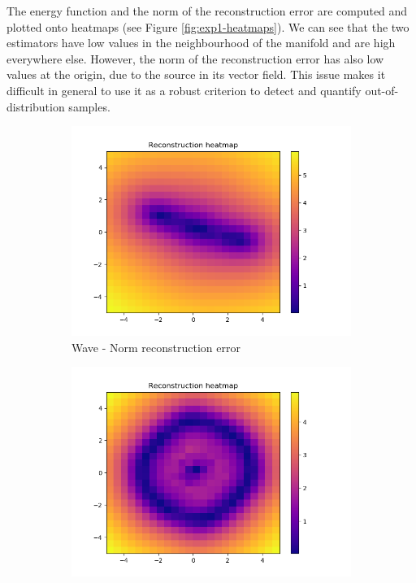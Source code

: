 The energy function and the norm of the reconstruction error are computed and plotted onto heatmaps (see Figure \ref{fig:exp1-heatmaps}). We can see that the two estimators have low values in the neighbourhood of the manifold and are high everywhere else. However, the norm of the reconstruction error has also low values at the origin, due to the source in its vector field. This issue makes it difficult in general to use it as a robust criterion to detect and quantify out-of-distribution samples.
\begin{figure}[!h]
\centering
\begin{subfigure}{.5\textwidth}
  \centering
  \includegraphics[width=.95\linewidth]{figures/wave-quantifier-reconstruction}
  \caption{Wave - Norm reconstruction error}
\end{subfigure}%
\begin{subfigure}{.5\textwidth}
  \centering
  \includegraphics[width=.95\linewidth]{figures/circle-quantifier-reconstruction}

\end{subfigure}
\end{figure}
